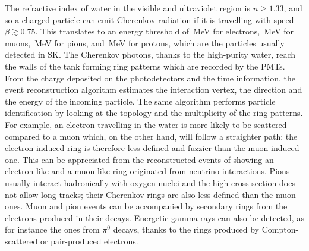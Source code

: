 The refractive index of water in the visible and ultraviolet region is $n \geq 1.33$, %
and so a charged particle can emit Cherenkov radiation if it is travelling %
with speed $\beta \gtrsim 0.75$.
This translates to an energy threshold of \,MeV for electrons, \,MeV for muons, %
\,MeV for pions, and \,MeV for protons, which are the particles usually detected in SK.
The Cherenkov photons, thanks to the high-purity water, reach the walls of the tank forming ring patterns %
which are recorded by the PMTs.
From the charge deposited on the photodetectors and the time information, %
the event reconstruction algorithm estimates the interaction vertex, the direction and the energy of the incoming particle.
The same algorithm performs particle identification by looking at the topology and the multiplicity of the ring patterns.
For example, an electron travelling in the water is more likely to be scattered compared to a muon %
which, on the other hand, will follow a straighter path: %
the electron-induced ring is therefore less defined and fuzzier than the muon-induced one.
This can be appreciated from the reconstructed events of  showing an electron-like and %
a muon-like ring originated from neutrino interactions.
Pions usually interact hadronically with oxygen nuclei and the high cross-section does not allow long tracks; %
their Cherenkov rings are also less defined than the muon ones.
Muon and pion events can be accompanied by secondary rings from the electrons produced in their decays.
Energetic gamma rays can also be detected, as for instance the ones from $\pi^0$ decays, %
thanks to the rings produced by Compton-scattered or pair-produced electrons.

